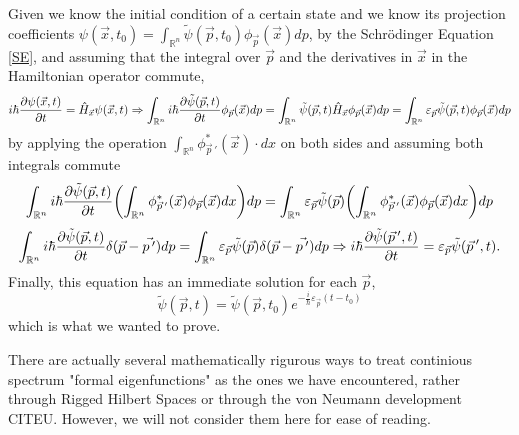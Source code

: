 \documentclass[11pt, a4paper]{article} %
\newcommand{\R}{\mathbb{R}} %
\DeclareRobustCommand{\mybox}[2][gray!10]{%
\begin{tcolorbox}[   %
        left=0.2cm,
        right=0.2cm,
        top=0.15cm,
        bottom=0.15cm,
        colback=#1,
        colframe=#1,
        width=\dimexpr\textwidth\relax, 
        enlarge left by=0mm,
        boxsep=5pt,
        arc=0pt,outer arc=0pt,
        ]
        #2
\end{tcolorbox}
}
\begin{document}
\begin{itemize}
\mybox{
Given we know the initial condition of a certain state and we know its projection coefficients $\psi(\vec{x},t_0)=\int_{\R^n}\tilde{\psi}(\vec{p},t_0)\phi_{\vec{p}}(\vec{x})dp$, by the Schrödinger Equation \eqref{SE}, and assuming that the integral over $\vec{p}$ and the derivatives in $\vec{x}$ in the Hamiltonian operator commute,
\begin{equation}
i\hbar\pdv{\psi(\vec{x},t)}{t}=\hat{H}_{\vec{x}}\psi(\vec{x},t)\Rightarrow \int_{\R^n}i\hbar\pdv{\tilde{\psi}(\vec{p},t)}{t}\phi_{\vec{p}}(\vec{x})dp =\int_{\R^n}\tilde{\psi}(\vec{p},t)\hat{H}_{\vec{x}}\phi_{\vec{p}}(\vec{x})dp=\int_{\R^n}\varepsilon_{\vec{p}}\tilde{\psi}(\vec{p},t)\phi_{\vec{p}}(\vec{x})dp
\end{equation}
by applying the operation $\int_{\R^n}\phi_{\vec{p}\,'}^*(\vec{x})\cdot dx$ on both sides and assuming both integrals commute
\begin{equation}
 \int_{\R^n}i\hbar\pdv{\tilde{\psi}(\vec{p},t)}{t}\qty(\int_{\R^n}\phi_{\vec{p}\,'}^*(\vec{x})\phi_{\vec{p}}(\vec{x})dx)dp=\int_{\R^n}\varepsilon_{\vec{p}}\tilde{\psi}(\vec{p})\qty(\int_{\R^n}\phi_{\vec{p}\,'}^*(\vec{x})\phi_{\vec{p}}(\vec{x})dx)dp
\end{equation}
$$
 \int_{\R^n}i\hbar\pdv{\tilde{\psi}(\vec{p},t)}{t}\delta(\vec{p}-\vec{p\,'})dp=\int_{\R^n}\varepsilon_{\vec{p}}\tilde{\psi}(\vec{p})\delta(\vec{p}-\vec{p\,'})dp\Rightarrow  i\hbar\pdv{\tilde{\psi}(\vec{p}\,',t)}{t}=\varepsilon_{\vec{p}}\tilde{\psi}(\vec{p}\,',t).
$$
Finally, this equation has an immediate solution for each $\vec{p}$,
\begin{equation}
\tilde{\psi}(\vec{p},t)=\tilde{\psi}(\vec{p},t_0)e^{-\frac{i}{\hbar}\varepsilon_{\vec{p}}(t-t_0)}
\end{equation}
which is what we wanted to prove.

}
\end{itemize}
There are actually several mathematically rigurous ways to treat continious spectrum "formal eigenfunctions" as the ones we have encountered, rather through Rigged Hilbert Spaces or through the von Neumann development CITEU. However, we will not consider them here for ease of reading.
\end{document}
